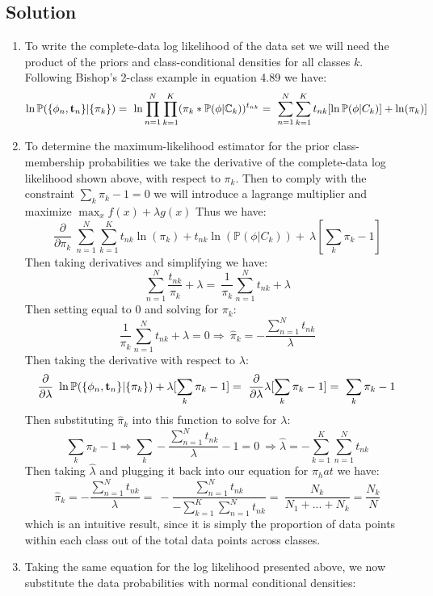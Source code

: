 \documentclass[submit]{harvardml}
\begin{document}
\subsection*{Solution}
\begin{enumerate}
	\item To write the complete-data log likelihood of the data set we will need the product of the priors and class-conditional densities for all classes $k$. Following Bishop's 2-class example in equation 4.89 we have:
	\[
	\ln \mathbb{P}(\{\phi_n, {\bf t}_n \} | \{\pi_k \}) = \
	\ln\prod_{n=1}^{N}\prod_{k=1}^{K}(\pi_k*\mathbb{P}(\phi|\mathbb{C}_k))^{t_{nk}} = \
	\sum_{n=1}^{N}\sum_{k=1}^{K}t_{nk}[\ln\mathbb{P}(\phi | C_k)]+\ln(\pi_k)] \
	\]
	\item To determine the maximum-likelihood estimator for the prior class-membership probabilities we take the derivative of the complete-data log likelihood shown above, with respect to $\pi_k$. Then to comply with the constraint  $\sum_k\pi_k - 1 = 0$ we will introduce a lagrange multiplier and maximize $\max_x f(x) + \lambda g(x)$ Thus we have:
	\[
	\frac{\partial}{\partial \pi_k} \
	\sum_{n=1}^{N}\sum_{k=1}^{K}t_{nk}\ln(\pi_k)+t_{nk}\ln(\mathbb{P}(\phi | C_k)) + \
	\lambda[\sum_k\pi_k - 1] \
	\]
	Then taking derivatives and simplifying we have:
	\[
	\sum_{n=1}^{N} \frac{t_{nk}}{\pi_k}+\lambda = \
	\frac{1}{\pi_k}\sum_{n=1}^{N} t_{nk} + \lambda \
	\]
	Then setting equal to $0$ and solving for $\pi_k$:
	\[
	\frac{1}{\pi_k}\sum_{n=1}^{N} t_{nk} + \lambda = 0 \Rightarrow \
	\hat \pi_k = -\frac{\sum_{n=1}^{N} t_{nk} }{\lambda} \
	\]
	Then taking the derivative with respect to $\lambda$:
	\[
	\frac{\partial}{\partial \lambda} \
	\ln \mathbb{P}(\{\phi_n, {\bf t}_n \} | \{\pi_k \}) +\lambda[\sum_k\pi_k - 1] = \
	\frac{\partial}{\partial \lambda}\lambda[\sum_k\pi_k - 1] = \
	\sum_k\pi_k - 1 \
	\]
	Then substituting $\hat \pi_k$ into this function to solve for $\lambda$:
	\[
	\sum_k\pi_k - 1 \Rightarrow \sum_k -\frac{\sum_{n=1}^{N} t_{nk} }{\lambda} -1 = 0 \
	\Rightarrow \hat \lambda = -\sum_{k=1}^{K} \sum_{n=1}^{N} t_{nk} \
	\]
	Then taking $\hat \lambda$ and plugging it back into our equation for $\pi_hat$ we have:
	\[
	\hat \pi_k = -\frac{\sum_{n=1}^{N} t_{nk} }{\lambda} = \
	-\frac{\sum_{n=1}^{N} t_{nk} }{-\sum_{k=1}^{K} \sum_{n=1}^{N} t_{nk}} = \
	\frac{N_k}{N_1+...+N_k} = \frac{N_k}{N} \
	\]
	which is an intuitive result, since it is simply the proportion of data points within each class out of the total data points across classes. 
	\item Taking the same equation for the log likelihood presented above, we now substitute the data probabilities with normal conditional densities:

\end{enumerate}
\end{document}
